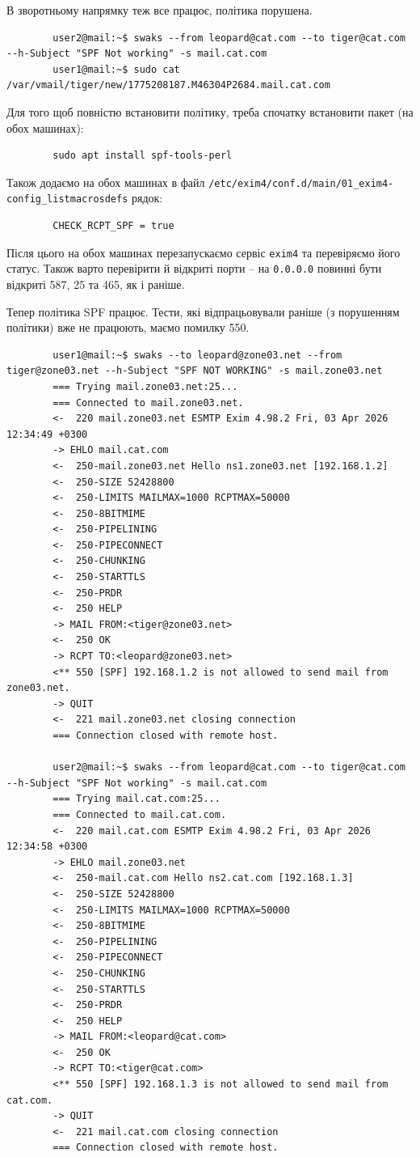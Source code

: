 \documentclass[14pt, a4paper]{extreport}
\begin{document}
	В зворотньому напрямку теж все працює, політика порушена.
	
	\begin{verbatim}
		user2@mail:~$ swaks --from leopard@cat.com --to tiger@cat.com --h-Subject "SPF Not working" -s mail.cat.com
		user1@mail:~$ sudo cat /var/vmail/tiger/new/1775208187.M46304P2684.mail.cat.com
	\end{verbatim}
	
	Для того щоб повністю встановити політику, треба спочатку встановити пакет (на обох машинах):
	
	\begin{verbatim}
		sudo apt install spf-tools-perl
	\end{verbatim}
	
	Також додаємо на обох машинах в файл \texttt{/etc/exim4/conf.d/main/01\_exim4-config\_listmacrosdefs} рядок:
	
	\begin{verbatim}
		CHECK_RCPT_SPF = true
	\end{verbatim}
	
	Після цього на обох машинах перезапускаємо сервіс \texttt{exim4} та перевіряємо його статус. Також варто перевірити й відкриті порти -- на \texttt{0.0.0.0} повинні бути відкриті 587, 25 та 465, як і раніше.
	
	Тепер політика SPF працює. Тести, які відпрацьовували раніше (з порушенням політики) вже не працюють, маємо помилку 550.
	
	\begin{verbatim}
		user1@mail:~$ swaks --to leopard@zone03.net --from tiger@zone03.net --h-Subject "SPF NOT WORKING" -s mail.zone03.net
		=== Trying mail.zone03.net:25...
		=== Connected to mail.zone03.net.
		<-  220 mail.zone03.net ESMTP Exim 4.98.2 Fri, 03 Apr 2026 12:34:49 +0300
		-> EHLO mail.cat.com
		<-  250-mail.zone03.net Hello ns1.zone03.net [192.168.1.2]
		<-  250-SIZE 52428800
		<-  250-LIMITS MAILMAX=1000 RCPTMAX=50000
		<-  250-8BITMIME
		<-  250-PIPELINING
		<-  250-PIPECONNECT
		<-  250-CHUNKING
		<-  250-STARTTLS
		<-  250-PRDR
		<-  250 HELP
		-> MAIL FROM:<tiger@zone03.net>
		<-  250 OK
		-> RCPT TO:<leopard@zone03.net>
		<** 550 [SPF] 192.168.1.2 is not allowed to send mail from zone03.net.
		-> QUIT
		<-  221 mail.zone03.net closing connection
		=== Connection closed with remote host.
		
		user2@mail:~$ swaks --from leopard@cat.com --to tiger@cat.com --h-Subject "SPF Not working" -s mail.cat.com
		=== Trying mail.cat.com:25...
		=== Connected to mail.cat.com.
		<-  220 mail.cat.com ESMTP Exim 4.98.2 Fri, 03 Apr 2026 12:34:58 +0300
		-> EHLO mail.zone03.net
		<-  250-mail.cat.com Hello ns2.cat.com [192.168.1.3]
		<-  250-SIZE 52428800
		<-  250-LIMITS MAILMAX=1000 RCPTMAX=50000
		<-  250-8BITMIME
		<-  250-PIPELINING
		<-  250-PIPECONNECT
		<-  250-CHUNKING
		<-  250-STARTTLS
		<-  250-PRDR
		<-  250 HELP
		-> MAIL FROM:<leopard@cat.com>
		<-  250 OK
		-> RCPT TO:<tiger@cat.com>
		<** 550 [SPF] 192.168.1.3 is not allowed to send mail from cat.com.
		-> QUIT
		<-  221 mail.cat.com closing connection
		=== Connection closed with remote host.
	\end{verbatim}
	
\end{document}
